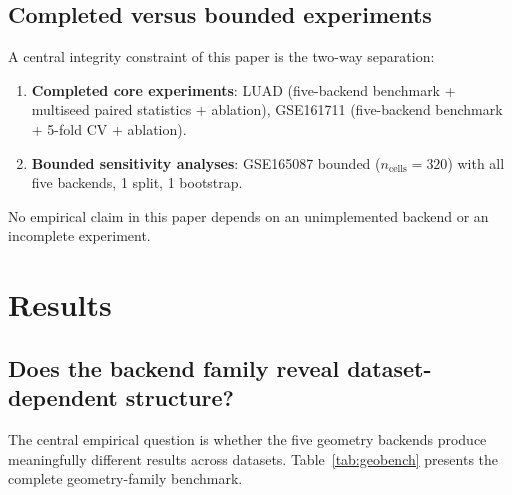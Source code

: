 \documentclass[11pt]{article}
\begin{document}
\subsection{Completed versus bounded experiments}

A central integrity constraint of this paper is the two-way separation:
\begin{enumerate}[leftmargin=1.5em]
\item \textbf{Completed core experiments}: LUAD (five-backend benchmark + multiseed paired statistics + ablation), GSE161711 (five-backend benchmark + 5-fold CV + ablation).
\item \textbf{Bounded sensitivity analyses}: GSE165087 bounded ($n_{\text{cells}} = 320$) with all five backends, 1 split, 1 bootstrap.
\end{enumerate}
No empirical claim in this paper depends on an unimplemented backend or an incomplete experiment.

\section{Results}
\label{sec:results}

\subsection{Does the backend family reveal dataset-dependent structure?}

The central empirical question is whether the five geometry backends produce meaningfully different results across datasets.
Table~\ref{tab:geobench} presents the complete geometry-family benchmark.
\end{document}

